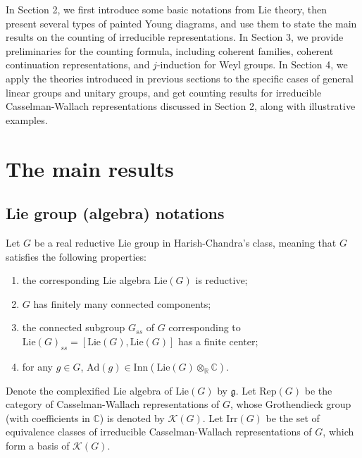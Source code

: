 \documentclass[12pt, a4paper]{amsart}
\numberwithin{equation}{section}
\newcommand{\BC}{{\mathbb {C}}}
\newcommand{\BR}{{\mathbb {R}}}
\newcommand{\CK}{{\mathcal {K}}}
\newcommand{\fg}{\mathfrak{g}}
\newcommand{\Irr}{{\mathrm{Irr}}}
\newcommand{\Inn}{{\mathrm{Inn}}}
\newcommand{\Ad}{{\mathrm{Ad}}}
\newcommand{\Lie}{{\mathrm{Lie}}}
\newcommand{\Rep}{{\mathrm{Rep}}}
\begin{document}
In Section 2, we first introduce some basic notations from Lie theory, then present several types of painted Young diagrams, and use them to state the main results on the counting of irreducible representations. In Section 3, we provide preliminaries for the counting formula, including coherent families, coherent continuation representations, and $j$-induction for Weyl groups. In Section 4, we apply the theories introduced in previous sections to the specific cases of general linear groups and unitary groups, and get counting results for irreducible Casselman-Wallach representations discussed in Section 2, along with illustrative examples. 

   













\section{The main results}


\subsection{Lie group (algebra) notations}
Let $G$ be a real reductive Lie group in Harish-Chandra's class, meaning that $G$ satisfies the following properties:
\begin{enumerate}
   \item the corresponding Lie algebra $\Lie (G)$ is reductive;
   \item $G$ has finitely many connected components;
   \item the connected subgroup $G_{ss}$ of $G$ corresponding to $\Lie(G)_{ss} = [\Lie(G),\Lie(G)]$ has a finite center;
   \item for any $g \in G$, $\Ad(g) \in \Inn(\Lie(G) \otimes_{\BR} \BC)$.
\end{enumerate}

Denote the complexified Lie algebra of $\Lie(G)$ by $\fg$. Let $\Rep(G)$ be the category of Casselman-Wallach representations of $G$, whose Grothendieck group (with coefficients in $\BC$) is denoted by $\CK(G)$. Let $\Irr (G)$ be the set of equivalence classes of irreducible Casselman-Wallach representations of $G$, which form a basis of $\CK(G)$.
\end{document}
